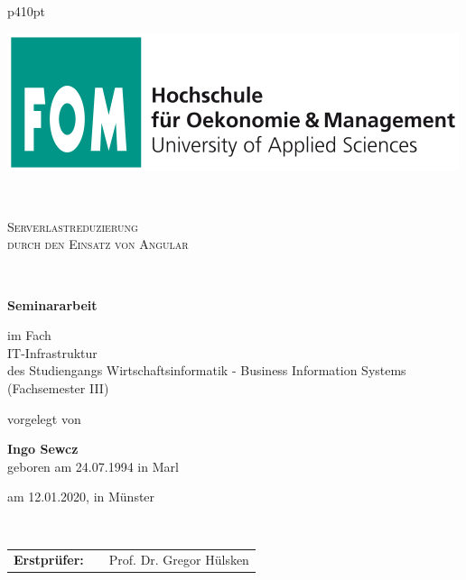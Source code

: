 \begin{center}
\begin{tabular}{p{410pt}}%


\begin{center}
\includegraphics[scale=0.4]{img/fomlogo.png}
\end{center}


\\

\begin{center}
\LARGE{\textsc{
Serverlastreduzierung\\durch den Einsatz von Angular\\
}}
\end{center}

\\

\begin{center}
\textbf{\Large{Seminararbeit}}
\end{center}


\begin{center}
im Fach\\
IT-Infrastruktur \\
des Studiengangs Wirtschaftsinformatik - Business Information Systems \\
(Fachsemester III)
\end{center}


\begin{center}
vorgelegt von
\end{center}

\begin{center}
\large{\textbf{Ingo Sewcz}} \\
\small{geboren am 24.07.1994 in Marl}
\end{center}

\begin{center}
\large{am 12.01.2020, in Münster}
\end{center}

\\

\begin{center}
\begin{tabular}{lll}
\textbf{Erstprüfer:} & & Prof. Dr. Gregor Hülsken\\
\end{tabular}
\end{center}

\end{tabular}
\end{center}

